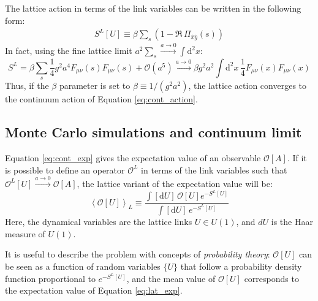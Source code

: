 The lattice action in terms of the link variables can be written in the following form:
\begin{equation}\label{eq:lat_action}
    \begin{aligned}
        S^L[U] \equiv \beta\sum_s\left(1-\Re\,\Pi_{\hat x\hat y}(s)\right)
    \end{aligned}
\end{equation}
In fact, using the fine lattice limit $a^2\sum_s \xrightarrow{a\to0} \int\mathrm d^2x$:
\[
    S^L = \beta\sum_s\frac{1}{4}g^2a^4F_{\mu\nu}(s)F_{\mu\nu}(s) + \mathcal O\left(a^5\right)
      \xrightarrow{a\to0} \beta g^2a^2\int\mathrm d^2x\,\frac{1}{4}F_{\mu\nu}(x)F_{\mu\nu}(x)
\]
Thus, if the $\beta$ parameter is set to $\beta \equiv 1/(g^2a^2)$,
the lattice action converges to the continuum action of Equation \eqref{eq:cont_action}.

\subsection*{Monte Carlo simulations and continuum limit}

Equation \eqref{eq:cont_exp} gives the expectation value of an observable $\mathcal O[A]$.
If it is possible to define an operator $\mathcal O^L$ in terms of the link variables such that $\mathcal O^L[U] \xrightarrow{a\to0} \mathcal O[A]$,
the lattice variant of the expectation value will be:
\begin{equation}\label{eq:lat_exp}
    \left<\mathcal O[U]\right>_L \equiv \frac{\int[\mathrm dU]\, \mathcal O[U] e^{-S^L[U]}}{\int[\mathrm dU]\,e^{-S^L[U]}}
\end{equation}
Here, the dynamical variables are the lattice links $U \in U(1)$, and $dU$ is the Haar measure of $U(1)$.

It is useful to describe the problem with concepts of \emph{probability theory}:
$\mathcal O[U]$ can be seen as a function of random variables $\{U\}$ that follow a probability density function proportional to $e^{-S^L[U]}$,
and the mean value of $\mathcal O[U]$ corresponds to the expectation value of Equation \eqref{eq:lat_exp}.

